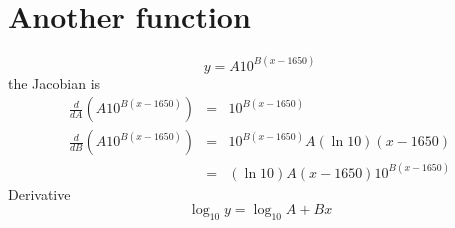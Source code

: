 \documentclass{article}
\begin{document}
\section{Another function}

\begin{equation}
y=A10^{B\left( x-1650\right) }
\end{equation}%
the Jacobian is%
\begin{eqnarray}
\frac{d}{dA}\left( A10^{B\left( x-1650\right) }\right)  &=&10^{B\left(
x-1650\right) } \\
\frac{d}{dB}\left( A10^{B\left( x-1650\right) }\right)  &=&10^{B\left(
x-1650\right) }A\left( \ln 10\right) \left( x-1650\right)  \\
&=&\left( \ln 10\right) A\left( x-1650\right) 10^{B\left( x-1650\right) }
\end{eqnarray}%
Derivative 
\begin{equation}
\log _{10}y=\log _{10}A+Bx
\end{equation}
\end{document}
